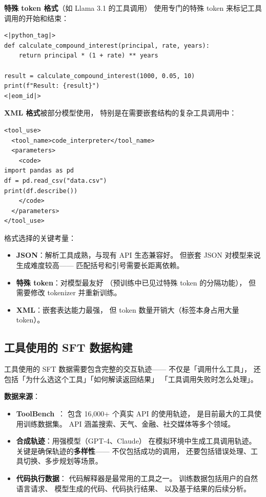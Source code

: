 \textbf{特殊 token 格式}（如 Llama 3.1 的工具调用）
使用专门的特殊 token 来标记工具调用的开始和结束：

\begin{lstlisting}[caption={Special token-based tool calling (Llama 3.1 style)}]
<|python_tag|>
def calculate_compound_interest(principal, rate, years):
    return principal * (1 + rate) ** years

result = calculate_compound_interest(1000, 0.05, 10)
print(f"Result: {result}")
<|eom_id|>
\end{lstlisting}

\textbf{XML 格式}被部分模型使用，
特别是在需要嵌套结构的复杂工具调用中：

\begin{lstlisting}[caption={XML-based tool calling format}]
<tool_use>
  <tool_name>code_interpreter</tool_name>
  <parameters>
    <code>
import pandas as pd
df = pd.read_csv("data.csv")
print(df.describe())
    </code>
  </parameters>
</tool_use>
\end{lstlisting}

格式选择的关键考量：
\begin{itemize}[noitemsep]
  \item \textbf{JSON}：解析工具成熟，与现有 API 生态兼容好。
        但嵌套 JSON 对模型来说生成难度较高——
        匹配括号和引号需要长距离依赖。
  \item \textbf{特殊 token}：对模型最友好
       （预训练中已见过特殊 token 的分隔功能），
        但需要修改 tokenizer 并重新训练。
  \item \textbf{XML}：嵌套表达能力最强，
        但 token 数量开销大（标签本身占用大量 token）。
\end{itemize}

\subsection{工具使用的 SFT 数据构建}

工具使用的 SFT 数据需要包含完整的交互轨迹——
不仅是「调用什么工具」，
还包括「为什么选这个工具」「如何解读返回结果」
「工具调用失败时怎么处理」。

\textbf{数据来源}：
\begin{itemize}[noitemsep]
  \item \textbf{ToolBench}~\cite{qin2023toolllm}：
        包含 16,000+ 个真实 API 的使用轨迹，
        是目前最大的工具使用训练数据集。
        API 涵盖搜索、天气、金融、社交媒体等多个领域。
  \item \textbf{合成轨迹}：用强模型（GPT-4、Claude）
        在模拟环境中生成工具调用轨迹。
        关键是确保轨迹的\textbf{多样性}——
        不仅包括成功的调用，
        还要包括错误处理、工具切换、多步规划等场景。
  \item \textbf{代码执行数据}：
        代码解释器是最常用的工具之一。
        训练数据包括用户的自然语言请求、
        模型生成的代码、代码执行结果、
        以及基于结果的后续分析。
\end{itemize}

